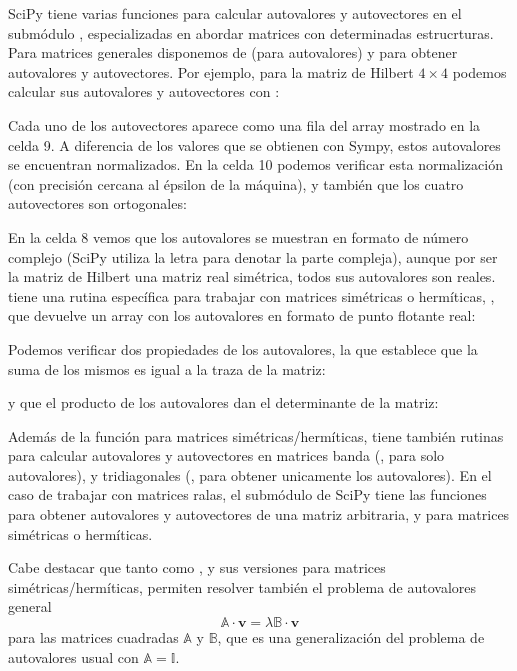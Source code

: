 SciPy tiene varias funciones para calcular autovalores y autovectores en el submódulo , especializadas en abordar matrices con determinadas estrucrturas. Para matrices generales disponemos de  (para autovalores) y  para obtener autovalores y autovectores. Por ejemplo, para la matriz de Hilbert $4 \times 4$ podemos calcular sus autovalores y autovectores con :

Cada uno de los autovectores aparece como una fila del array mostrado en la celda 9. A diferencia de los valores que se obtienen con Sympy, estos autovalores se encuentran normalizados. En la celda 10 podemos verificar esta normalización (con precisión cercana al épsilon de la máquina), y también que los cuatro autovectores son ortogonales:

En la celda 8 vemos que los autovalores se muestran en formato de número complejo (SciPy utiliza la letra  para denotar la parte compleja), aunque por ser la matriz de Hilbert una matriz real simétrica, todos sus autovalores son reales.  tiene una rutina específica para trabajar con matrices simétricas o hermíticas, , que devuelve un array con los autovalores en formato de punto flotante real:  

Podemos verificar dos propiedades de los autovalores, la que establece que la suma de los mismos es igual a la traza de la matriz:

y que el producto de los autovalores dan el determinante de la matriz:

Además de la función para matrices simétricas/hermíticas,  tiene también rutinas para calcular autovalores y autovectores en matrices banda (,  para solo autovalores), y tridiagonales (,  para obtener unicamente los autovalores). En el caso de trabajar con matrices ralas, el submódulo de SciPy  tiene las funciones  para obtener autovalores y autovectores de una matriz arbitraria, y  para matrices simétricas o hermíticas.

Cabe destacar que tanto  como , y sus versiones para matrices simétricas/hermíticas, permiten resolver también el problema de autovalores general
\begin{equation}
 \mathbb{A} \cdot \bm{v} = \lambda \mathbb{B} \cdot \bm{v}
\end{equation} 
para las matrices cuadradas $\mathbb{A}$ y $\mathbb{B}$, que es una generalización del problema de autovalores usual con $\mathbb{A} = \mathbb{I}$.



